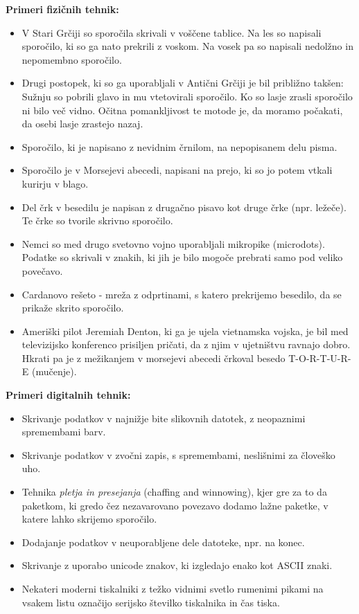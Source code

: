 \documentclass[a4paper, 12pt]{article}
\begin{document}
        \textbf{Primeri fizičnih tehnik:}
        \begin{itemize}
            \item V Stari Grčiji so sporočila skrivali v voščene tablice. Na les so napisali sporočilo, ki so ga nato prekrili z voskom. Na vosek pa so napisali nedolžno in nepomembno sporočilo.
            \item Drugi postopek, ki so ga uporabljali v Antični Grčiji je bil približno takšen: Sužnju so pobrili glavo in mu vtetovirali sporočilo. Ko so lasje zrasli sporočilo ni bilo več vidno. Očitna pomankljivost te motode je, da moramo počakati, da osebi lasje zrastejo nazaj.
            \item Sporočilo, ki je napisano z nevidnim črnilom, na nepopisanem delu pisma.
            \item Sporočilo je v Morsejevi abecedi, napisani na prejo, ki so jo potem vtkali kurirju  v blago.
            \item Del črk v besedilu je napisan z drugačno pisavo kot druge črke (npr. ležeče). Te črke so tvorile skrivno sporočilo. \cite{wikipedia}
            \item Nemci so med drugo svetovno vojno uporabljali mikropike (microdots). Podatke so skrivali v znakih, ki jih je bilo mogoče prebrati samo pod veliko povečavo. \cite{monitor}
            \item Cardanovo rešeto - mreža z odprtinami, s katero prekrijemo besedilo, da se prikaže skrito sporočilo.
            \item Ameriški pilot Jeremiah Denton, ki ga je ujela vietnamska vojska, je bil med televizijsko konferenco prisiljen pričati, da z njim v ujetništvu ravnajo dobro. Hkrati pa je z mežikanjem v morsejevi abecedi črkoval besedo T-O-R-T-U-R-E (mučenje).\cite{delo}
        \end{itemize}

        \textbf{Primeri digitalnih tehnik:}
        \begin{itemize}
            \item Skrivanje podatkov v najnižje bite slikovnih datotek, z neopaznimi spremembami barv.
            \item Skrivanje podatkov v zvočni zapis, s spremembami, neslišnimi za človeško uho.
            \item Tehnika \textit{pletja in presejanja} (chaffing and winnowing), kjer gre za to da paketkom, ki gredo čez nezavarovano povezavo dodamo lažne paketke, v katere lahko skrijemo sporočilo.
            \item Dodajanje podatkov v neuporabljene dele datoteke, npr. na konec.
            \item Skrivanje z uporabo unicode znakov, ki izgledajo enako kot ASCII znaki.
            \item Nekateri moderni tiskalniki z težko vidnimi svetlo rumenimi pikami na vsakem listu označijo serijsko številko tiskalnika in čas tiska.
            \cite{wikipedia}
        \end{itemize}
\end{document}
